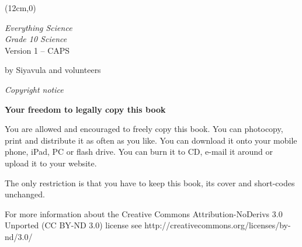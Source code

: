 
\begin{titlepage}
\begin{adjustwidth}{1in}{1in}
\begin{center}
    \thispagestyle{empty}

    \vspace*{4in}

\makebox(12cm,0){}%
    
    {\normalfont\sffamily\fontsize{36}\normalfont\itshape{Everything Science} \\ \vspace*{1cm}
     \normalfont\sffamily\fontsize{22}\normalfont\itshape{Grade 10 Science}}
    \vspace*{1in} \\
    \LARGE Version 1 -- CAPS \\

   {\vspace*{2in}
     by Siyavula and volunteers 
  

\vfill

    }
\end{center}
\end{adjustwidth}
\end{titlepage}






\newpage
\thispagestyle{empty}
\begin{center}
\normalfont\sffamily\fontsize{22}\normalfont\itshape Copyright notice\\

\vspace*{1in}

\textbf{Your freedom to legally copy this book}\\

\end{center}


{\LARGE
You are allowed and encouraged to freely copy this book. You can photocopy, print and distribute it as
often as you like. You can download it onto your mobile phone, iPad, PC or flash drive. You can burn it
to CD, e-mail it around or upload it to your website. \par

The only restriction is that you have to keep this book, its cover and short-codes unchanged.\par

For more information about the Creative Commons Attribution-NoDerivs 3.0 Unported (CC BY-ND
3.0) license see http://creativecommons.org/licenses/by-nd/3.0/}\\

